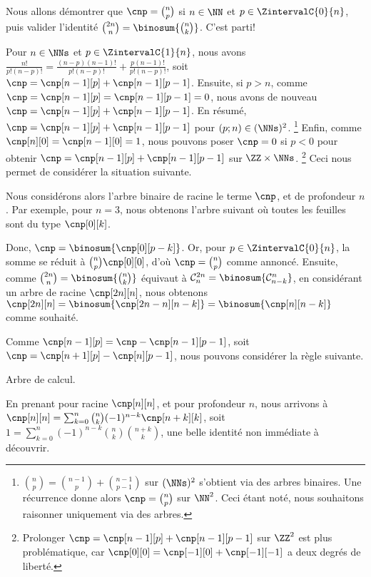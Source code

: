Nous allons démontrer que $\cnp = \binom{n}{p}$ si $n \in \NN$ et $p \in \ZintervalC{0}{n}$,
puis valider l'identité $\binom{2n}{n} = \binosum{\binom{n}{k}}$.
C'est parti!


Pour $n \in \NNs$ et $p \in \ZintervalC{1}{n}$,
nous avons
$\frac{n!}{p!(n-p)!}
=\frac{(n-p)(n-1)!}{p!(n-p)!} + \frac{p(n-1)!}{p!(n-p)!}$,
soit
$\cnp = \cnp[n-1][p] + \cnp[n-1][p-1]$.
Ensuite,
si $p > n$, comme
$\cnp = \cnp[n-1][p] = \cnp[n-1][p-1] = 0$,
nous avons de nouveau
$\cnp = \cnp[n-1][p] + \cnp[n-1][p-1]$.
En résumé,
$\cnp = \cnp[n-1][p] + \cnp[n-1][p-1]$ pour $(p;n) \in (\NNs)^2$.%
\footnote{
	$\binom{n}{p} = \binom{n-1}{p} + \binom{n-1}{p-1}$ sur $ (\NNs)^2$
	s'obtient via des arbres binaires.
	Une récurrence donne alors 
	$\cnp = \binom{n}{p}$ sur $\NN^2$.
	Ceci étant noté, nous souhaitons raisonner uniquement via des arbres.
}
Enfin,
comme
$\cnp[n][0] = \cnp[n-1][0] = 1$,
nous pouvons poser
$\cnp = 0$ si $p < 0$
pour obtenir
$\cnp = \cnp[n-1][p] + \cnp[n-1][p-1]$ sur $\ZZ \times \NNs$.%
\footnote{
	Prolonger $\cnp = \cnp[n-1][p] + \cnp[n-1][p-1]$ sur $\ZZ^2$ est plus problématique, car $\cnp[0][0] = \cnp[-1][0] + \cnp[-1][-1]$ a deux degrés de liberté.
}
%
Ceci nous permet de considérer la situation suivante.

\explaintree{\cnp}{\cnp[n-1][p-1]}{\cnp[n-1][p]}%
            {\factobinomintertree}{}


Nous considérons alors l'arbre binaire de racine le terme $\cnp$, et de profondeur $n$.
Par exemple, pour $n=3$, nous obtenons l'arbre suivant où toutes les feuilles sont du type $\cnp[0][k]$.


Donc,
$\cnp = \binosum{\cnp[0][p-k]}$.
Or, pour $p \in \ZintervalC{0}{n}$, la somme se réduit à $\binom{n}{p} \cnp[0][0]$, d'où $\cnp = \binom{n}{p}$ comme annoncé.
%
Ensuite,
comme
$\binom{2n}{n} = \binosum{\binom{n}{k}}$
équivaut à
$\mathcal{C}^{2n}_n = \binosum{\mathcal{C}^n_{n-k}}$,
en considérant un arbre de racine $\cnp[2n][n]$, nous obtenons
$\cnp[2n][n] = \binosum{\cnp[2n - n][n-k]} = \binosum{\cnp[n][n-k]}$
comme souhaité.




\begin{remark}
	Comme $\cnp[n-1][p] = \cnp - \cnp[n-1][p-1]$,
	soit $\cnp = \cnp[n+1][p] - \cnp[n][p-1]$,
	nous pouvons considérer la règle suivante.

    \begin{center}
    	\itshape\centering
    
    	\calctree{\cnp}{\cnp[n+1][p]}{-\cnp[n][p-1]}
    	
    	Arbre de calcul.
    \end{center}
    
    En prenant pour racine $\cnp[n][n]$, et pour profondeur $n$,
	nous arrivons à
    $\cnp[n][n] = \sum_{k=0}^n \binom{n}{k} (-1)^{n-k} \cnp[n+k][k]$,
    soit
    $1 = \sum_{k=0}^n (-1)^{n-k} \binom{n}{k} \binom{n+k}{k}$,
    une belle identité non immédiate à découvrir.
\end{remark}
